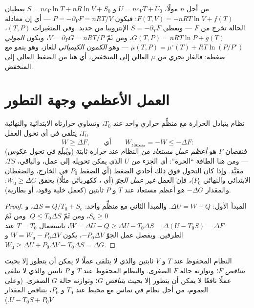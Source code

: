 \begin{example}\label{ex:b2:thermodynamic-potentials:perfect}
من أجل $n$ مولًا، $U = nc_{V}T + U_0$ و $S = nc_V\ln T + nR\ln V + S_0$
يعطيان $F(T,V) = -nRT\ln V + f(T)$: فيكون $P = -\partial_VF = nRT/V$
--- أي إن معادلة الحالة تخرج من $F$ --- ويعطي $S = -\partial_TF$
الإنتروبيا من جديد. وفي المتغيرات $(T,P)$، $G(T,P) = nRT\ln P +
g(T)$، ومن ثَمّ $V = \partial_PG = nRT/P$، ويكون  \emph{المولي}
$\mu(T,P) = \mu^\circ(T) + RT\ln(P/P^\circ)$ --- وهو \emph{الكمون
الكيميائي} للغاز، وهو ينمو مع
ضغطه: فالغاز يجري من $\mu$ العالي إلى المنخفض، أي هنا من الضغط العالي
إلى المنخفض.
\end{example}

\section{العمل الأعظمي وجهة التطور}

\begin{theorem}\label{thm:b2:thermodynamic-potentials:monothermal}
نظام يتبادل الحرارة مع منظِّم حراري واحد عند $T_0$، وتساوي
حرارتاه الابتدائية والنهائية $T_0$، يتلقى في أي
تحول العمل
\[
W \ge \Delta F , \qquad\text{أي}\qquad W_{\text{مستعاد}} = -W \le -\Delta F :
\]
فنقصان $F$ هو \emph{أعظم عمل مستعاد} من
النظام عند حرارة ثابتة (ويُبلَغ في تحول عكوس) ---
ومن هنا الطاقة ``الحرة'': أي الجزء من $U$ الذي يمكن تحويله إلى عمل،
والباقي، $TS$، مقيَّد. وإذا كان التحول فوق ذلك أحادي الضغط
(أي الضغط $P_0$ في الخارج، والضغطان الابتدائي والنهائي $P_0$)، فإن العمل
\emph{غير عمل الجوّ} (أي ، ككهربائي مثلًا)
يحقق $W_{\text{u}} \ge \Delta G$: والمقدار $-\Delta G$ هو أعظم 
مستعاد عند $T$ و $P$ ثابتين (كعمل خلية وقود، أو
بطارية).
\end{theorem}

\begin{proof}
المبدأ الأول: $\Delta U = W + Q$. والمبدأ الثاني مع منظِّم واحد: $\Delta S
= Q/T_0 + S_{\text{c}}$، و $S_{\text{c}} \ge 0$، ومن ثَمّ $Q \le T_0\Delta S$. ومن ثَمّ
$W = \Delta U - Q \ge \Delta U - T_0\Delta S = \Delta(U - T_0S) = \Delta F$، باستعمال
$T = T_0$ عند الطرفين. وبفصل عمل الجوّ $-P_0\Delta V$،
يكون $W = W_{\text{u}} - P_0\Delta V$ و $W_{\text{u}} \ge \Delta U + P_0
\Delta V - T_0\Delta S = \Delta G$.
\end{proof}

\begin{theorem}\label{thm:b2:thermodynamic-potentials:criteria}
النظام المحفوظ عند $T$ و $V$ ثابتين والذي لا يتلقى عملًا لا يمكن
أن يتطور إلا بحيث \emph{يتناقص $F$}؛ وتوازنه حالة
$F$ الصغرى. والنظام المحفوظ عند $T$ و $P$ ثابتين والذي لا يتلقى عملًا
نافعًا لا يمكن أن يتطور إلا بحيث \emph{يتناقص $G$}؛ وتوازنه
حالة $G$ الصغرى. (وعلى العموم، من أجل نظام في تماس
مع محيط عند $T_0$ و $P_0$، يتناقص المقدار $U - T_0S + P_0V$.)
\end{theorem}

